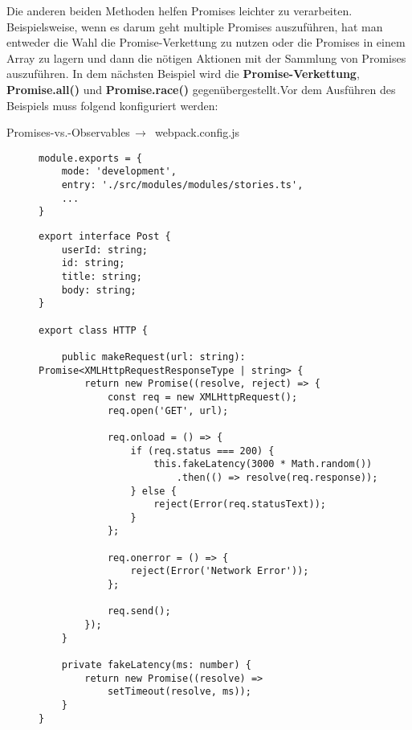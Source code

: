 \noindent
Die anderen beiden Methoden helfen Promises leichter zu verarbeiten. Beispielsweise, wenn es darum geht multiple Promises auszuführen, hat man entweder die Wahl die Promise-Verkettung zu nutzen oder die Promises in einem Array zu lagern und dann die nötigen Aktionen mit der Sammlung von Promises auszuführen. In dem nächsten Beispiel wird die \textbf{Promise-Verkettung}, \textbf{Promise.all()} und \textbf{Promise.race()} gegenübergestellt.Vor dem Ausführen des Beispiels muss folgend konfiguriert werden:

 \begin{center}
     Promises-vs.-Observables$\,\to\,$ webpack.config.js
 \end{center}

\begin{figure}[H]
\begin{lstlisting}
module.exports = {
    mode: 'development',
    entry: './src/modules/modules/stories.ts',
    ...
}
\end{lstlisting}
\end{figure}


\begin{figure}[H]
\begin{lstlisting}
export interface Post {
    userId: string;
    id: string;
    title: string;
    body: string;
}

export class HTTP {

    public makeRequest(url: string): Promise<XMLHttpRequestResponseType | string> {
        return new Promise((resolve, reject) => {
            const req = new XMLHttpRequest();
            req.open('GET', url);

            req.onload = () => {
                if (req.status === 200) {
                    this.fakeLatency(3000 * Math.random())
                        .then(() => resolve(req.response));
                } else {
                    reject(Error(req.statusText));
                }
            };

            req.onerror = () => {
                reject(Error('Network Error'));
            };

            req.send();
        });
    }

    private fakeLatency(ms: number) {
        return new Promise((resolve) =>
            setTimeout(resolve, ms));
    }
}
\end{lstlisting}
\end{figure}


